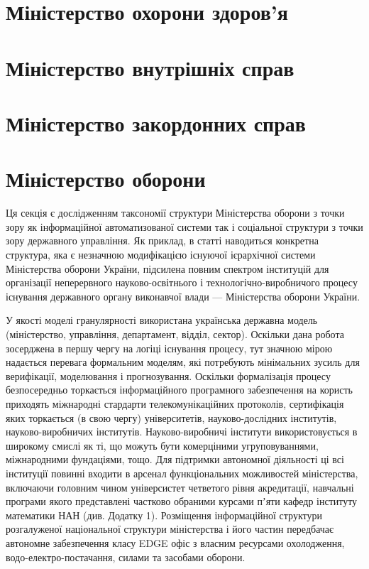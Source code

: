 \section{Міністерство охорони здоров'я}

\section{Міністерство внутрішніх справ}

\section{Міністерство закордонних справ}

\newpage
\section{Міністерство оборони}

Ця секція є дослідженням таксономії структури Міністерства
оборони з точки зору як інформаційної автоматизованої системи
так і соціальної структури з точки зору державного управління.
Як приклад, в статті наводиться конкретна структура, яка є незначною
модифікацією існуючої ієрархічної системи Міністерства оборони України,
підсилена повним спектром інституцій для організації неперервного
науково-освітнього і технологічно-виробничого процесу існування
державного органу виконавчої влади — Міністерства оборони України.

У якості моделі гранулярності використана українська державна модель
(міністерство, управління, департамент, відділ, сектор). Оскільки дана робота
зосерджена в першу чергу на логіці існування процесу, тут значною мірою
надається перевага формальним моделям, які потребують мінімальних зусиль
для верифікації, моделювання і прогнозування. Оскільки формалізація процесу
безпосередньо торкається інформаційного програмного забезпечення на користь
приходять міжнародні стардарти телекомунікаційних протоколів, сертифікація
яких торкається (в свою чергу) університетів, науково-дослідних інститутів,
науково-виробничих інститутів. Науково-виробничі інститути використовується
в широкому смислі як ті, що можуть бути комерціними угруповуваннями,
міжнародними фундаціями, тощо. Для підтримки автономної діяльності ці
всі інституції повинні входити в арсенал функціональних можливостей
міністерства, включаючи головним чином універсистет четветого рівня
акредитації, навчальні програми якого представлені частково обраними
курсами пʼяти кафедр інституту математики НАН (див. Додатку 1).
Розміщення інформаційної структури розгалуженої національної
структури міністерства і його частин передбачає автономне
забезпечення класу EDGE офіс з власним ресурсами охолодження,
водо-електро-постачання, силами та засобами оборони.

